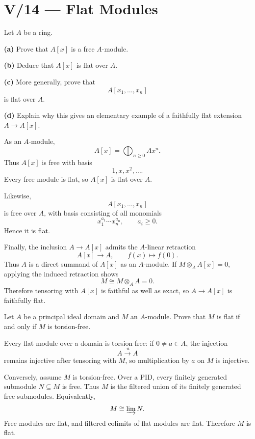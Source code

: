 \section*{V/14 --- Flat Modules}

\begin{problem}[CP-V-0019]
\label{prob:cp-v-0019}
Let \(A\) be a ring.

\textbf{(a)} Prove that \(A[x]\) is a free \(A\)-module.

\textbf{(b)} Deduce that \(A[x]\) is flat over \(A\).

\textbf{(c)} More generally, prove that
\[
A[x_1,\dots,x_n]
\]
is flat over \(A\).

\textbf{(d)} Explain why this gives an elementary example of a faithfully flat
extension \(A\to A[x]\).
\end{problem}

\begin{solution}
As an \(A\)-module,
\[
A[x]
=
\bigoplus_{n\ge0}A x^n.
\]
Thus \(A[x]\) is free with basis
\[
1,x,x^2,\dots.
\]
Every free module is flat, so \(A[x]\) is flat over \(A\).

Likewise,
\[
A[x_1,\dots,x_n]
\]
is free over \(A\), with basis consisting of all monomials
\[
x_1^{a_1}\cdots x_n^{a_n},
\qquad a_i\ge0.
\]
Hence it is flat.

Finally, the inclusion \(A\to A[x]\) admits the \(A\)-linear retraction
\[
A[x]\longrightarrow A,\qquad f(x)\longmapsto f(0).
\]
Thus \(A\) is a direct summand of \(A[x]\) as an \(A\)-module. If
\(M\otimes_A A[x]=0\), applying the induced retraction shows
\[
M\cong M\otimes_A A=0.
\]
Therefore tensoring with \(A[x]\) is faithful as well as exact, so
\(A\to A[x]\) is faithfully flat.
\end{solution}


\begin{problem}[CP-V-0106]
\label{prob:cp-v-0106}
Let \(A\) be a principal ideal domain and \(M\) an \(A\)-module. Prove that \(M\) is flat if and only if \(M\) is torsion-free.
\end{problem}

\begin{solution}
Every flat module over a domain is torsion-free: if \(0\ne a\in A\), the injection
\[
A\xrightarrow{\cdot a}A
\]
remains injective after tensoring with \(M\), so multiplication by \(a\) on \(M\) is injective.

Conversely, assume \(M\) is torsion-free. Over a PID, every finitely generated submodule \(N\subseteq M\) is free. Thus \(M\) is the filtered union of its finitely generated free submodules. Equivalently,
\[
M\cong\varinjlim N.
\]
Free modules are flat, and filtered colimits of flat modules are flat. Therefore \(M\) is flat.
\end{solution}



